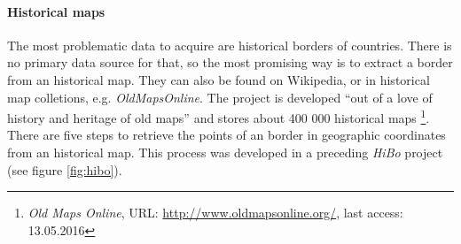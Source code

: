 \paragraph{Historical maps} %
\label{par:historical_map}

The most problematic data to acquire are historical borders of countries. There is no primary data source for that, so the most promising way is to extract a border from an historical map. They can also be found on Wikipedia, or in historical map colletions, e.g. \emph{OldMapsOnline}. The project is developed ``out of a love of history and heritage of old maps'' and stores about 400 000 historical maps
\footnote{
  \textit{Old Maps Online},
  URL: \url{http://www.oldmapsonline.org/},
  last access: 13.05.2016
}.
There are five steps to retrieve the points of an border in geographic coordinates from an historical map. This process was developed in a preceding \emph{HiBo} project
(see figure \ref{fig:hibo}).

